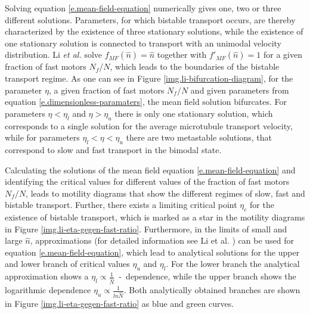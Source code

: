 Solving equation \eqref{e.mean-field-equation} numerically gives one, two or three different solutions. Parameters, for which bistable transport occurs, are thereby characterized by the existence
of three stationary solutions, while the existence of one stationary solution is connected to transport with an unimodal velocity distribution. Li \textit{et al.} \cite{li} solve
\mbox{$f_{MF}\left(\hat n\right) = \hat n$} together with \mbox{$f\prime_{MF}\left(\hat n\right) = 1$} for a given fraction of fast motors $N_f/N$, which leads to the boundaries of the bistable
transport regime. As one can see in Figure \ref{img.li-bifurcation-diagram}, for the parameter $\eta$, a given fraction of fast motors $N_f/N$ and given parameters from equation
\eqref{e.dimensionless-paramaters}, the mean field solution bifurcates. For parameters \mbox{$\eta < \eta_l$} and \mbox{$\eta > \eta_u$} there is only one stationary solution, which corresponds to
a single solution for the average microtubule transport velocity, while for parameters \mbox{$\eta_l < \eta < \eta_u$} there are two metastable solutions, that correspond to slow and fast
transport in the bimodal state.

Calculating the solutions of the mean field equation \eqref{e.mean-field-equation} and identifying the critical values for different values of the fraction of fast motors $N_f/N$, leads to motility
diagrams that show the different regimes of slow, fast and bistable transport. Further, there exists a limiting critical point $\eta_c$ for the existence of bistable transport, which is marked as
a star in the
motility diagrams in Figure \ref{img.li-eta-gegen-fast-ratio}. Furthermore, in the limits of small and large $\hat n$, approximations (for detailed information see Li et al. \cite{li}) can be
used for equation \eqref{e.mean-field-equation}, which lead to analytical solutions for the upper and lower branch of critical values $\eta_u$ and $\eta_l$. For the lower branch the analytical
approximation shows a \mbox{$\eta_l \propto \frac{1}{\hat N}$ - dependence}, while the upper branch shows the logarithmic dependence \mbox{$\eta_u \propto \frac{1}{ln \hat N}$}. Both analytically
obtained branches are shown in Figure \ref{img.li-eta-gegen-fast-ratio} as blue and green curves.

